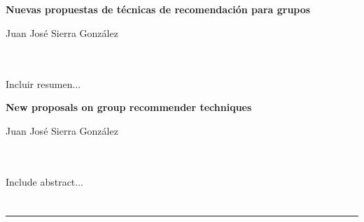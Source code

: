\chapter*{}






\cleardoublepage
\thispagestyle{empty}

\begin{center}
{\large\bfseries Nuevas propuestas de técnicas de recomendación para grupos}\\
\end{center}
\begin{center}
Juan José Sierra González\\
\end{center}

\\

\vspace{0.7cm}
\\

Incluir resumen...
\cleardoublepage


\thispagestyle{empty}


\begin{center}
{\large\bfseries New proposals on group recommender techniques}\\
\end{center}
\begin{center}
Juan José Sierra González\\
\end{center}

\\

\vspace{0.7cm}
\\

Include abstract...

\chapter*{}
\thispagestyle{empty}

\noindent\rule[-1ex]{\textwidth}{2pt}\\[4.5ex]


